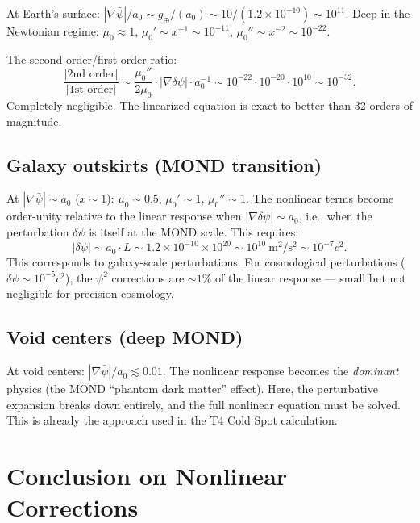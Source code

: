 \documentclass[11pt]{article}
\newcommand{\ee}[1]{\times 10^{#1}}
\begin{document}
At Earth's surface: $|\nabla\bar{\psi}|/a_0 \sim g_\oplus/(a_0)
\sim 10/(1.2\ee{-10}) \sim 10^{11}$. Deep in the Newtonian regime:
$\mu_0 \approx 1$, $\mu_0' \sim x^{-1} \sim 10^{-11}$,
$\mu_0'' \sim x^{-2} \sim 10^{-22}$.

The second-order/first-order ratio:
\begin{equation}
\frac{|\text{2nd order}|}{|\text{1st order}|} \sim
\frac{\mu_0''}{2\mu_0} \cdot |\nabla\delta\psi| \cdot a_0^{-1}
\sim 10^{-22} \cdot 10^{-20} \cdot 10^{10} \sim 10^{-32}.
\end{equation}
Completely negligible. The linearized equation is exact to better than
32 orders of magnitude.

\subsection{Galaxy outskirts (MOND transition)}

At $|\nabla\bar{\psi}| \sim a_0$ ($x \sim 1$): $\mu_0 \sim 0.5$,
$\mu_0' \sim 1$, $\mu_0'' \sim 1$. The nonlinear terms become
order-unity relative to the linear response when $|\nabla\delta\psi|
\sim a_0$, i.e., when the perturbation $\delta\psi$ is itself at the
MOND scale. This requires:
\begin{equation}
|\delta\psi| \sim a_0 \cdot L \sim 1.2\ee{-10} \times 10^{20}
\sim 10^{10}~\text{m}^2/\text{s}^2 \sim 10^{-7}c^2.
\end{equation}
This corresponds to galaxy-scale perturbations. For cosmological
perturbations ($\delta\psi \sim 10^{-5}c^2$), the $\psi^2$ corrections
are $\sim 1\%$ of the linear response --- small but not negligible
for precision cosmology.

\subsection{Void centers (deep MOND)}

At void centers: $|\nabla\bar{\psi}|/a_0 \lesssim 0.01$. The
nonlinear response becomes the \emph{dominant} physics (the MOND
``phantom dark matter'' effect). Here, the perturbative expansion
breaks down entirely, and the full nonlinear equation must be solved.
This is already the approach used in the T4 Cold Spot calculation.

\section{Conclusion on Nonlinear Corrections}
\end{document}
